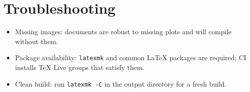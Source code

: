 \documentclass[12pt,a4paper]{article}
\begin{document}
\section{Troubleshooting}
\begin{tcolorbox}[colback=yellow!5!white,colframe=yellow!75!black,title=Common Issues]
\begin{itemize}
    \item Missing images: documents are robust to missing plots and will compile without them.
    \item Package availability: \texttt{latexmk} and common LaTeX packages are required; CI installs TeX Live groups that satisfy them.
    \item Clean build: run \texttt{latexmk -C} in the output directory for a fresh build.
\end{itemize}
\end{tcolorbox}
\end{document}
